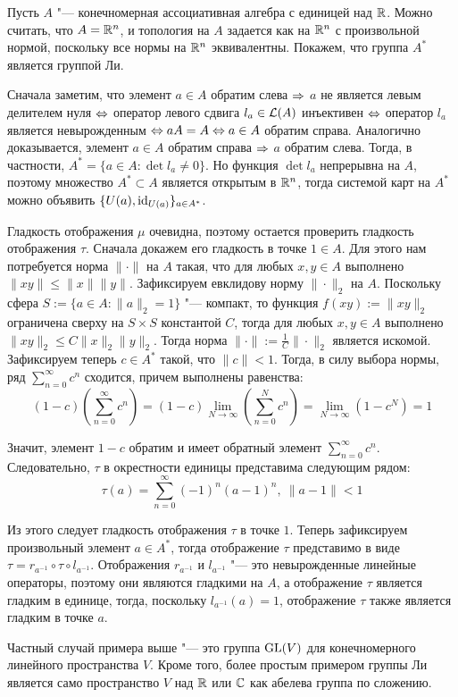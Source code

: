 \begin{example}
	Пусть $A$ "--- конечномерная ассоциативная алгебра с единицей над $\mathbb{R}$. Можно считать, что $A = \mathbb{R}^n$, и топология на $A$ задается как на $\mathbb{R}^n$ с произвольной нормой, поскольку все нормы на $\mathbb{R}^n$ эквивалентны. Покажем, что группа $A^*$ является группой Ли. 
	
	Сначала заметим, что элемент $a \in A$ обратим слева $\Rightarrow$ $a$ не является левым делителем нуля $\Leftrightarrow$ оператор левого сдвига $l_a \in \mathcal L(A)$ инъективен $\Leftrightarrow$ оператор $l_a$ является невырожденным $\lra aA = A \hm\lra a \in A$ обратим справа. Аналогично доказывается, элемент $a \in A$ обратим справа $\Rightarrow$ $a$ обратим слева. Тогда, в частности, $A^* = \{a \in A: \det{l_a} \ne 0\}$. Но  функция $\det{l_a}$ непрерывна на $A$, поэтому множество $A^* \subset A$ является открытым в $\mathbb{R}^n$, тогда системой карт на $A^*$ можно объявить $\{U(a), \mathrm{id}_{U(a)}\}_{a \in A^*}$.
	
	Гладкость отображения $\mu$ очевидна, поэтому остается проверить гладкость отображения $\tau$. Сначала докажем его гладкость в точке $1 \in A$. Для этого нам потребуется норма $\| \cdot \|$ на $A$ такая, что для любых $x, y \in A$ выполнено $\|xy\| \le \|x\| \|y\|$. Зафиксируем евклидову норму $\| \cdot \|_2$ на $A$. Поскольку сфера $S := \{a \in A: \|a\|_2 = 1\}$ "--- компакт, то функция $f(xy) := \|xy\|_2$ ограничена сверху на $S \times S$ константой $C$, тогда для любых $x, y \in A$ выполнено $\|xy\|_2 \le C\|x\|_2\|y\|_2$. Тогда норма $\|\cdot\| := \frac{1}{C}\|\cdot\|_2$ является искомой. Зафиксируем теперь $c \in A^*$ такой, что $\|c\| < 1$. Тогда, в силу выбора нормы, ряд $\sum_{n=0}^\infty c^n$ сходится, причем выполнены равенства:
	\[(1-c)\left(\sum_{n=0}^\infty c^n\right) = (1-c)\lim_{N \to \infty}\left(\sum_{n=0}^Nc^n\right) = \lim_{N \to \infty}\left(1 - c^N\right) = 1\]
	
	Значит, элемент $1 - c$ обратим и имеет обратный элемент $\sum_{n=0}^\infty c^n$. Следовательно, $\tau$ в окрестности единицы представима следующим рядом:
	\[\tau(a) = \sum_{n=0}^\infty (-1)^n(a - 1)^n,~\|a - 1\| < 1\]
	
	Из этого следует гладкость отображения $\tau$ в точке $1$. Теперь зафиксируем произвольный элемент $a \in A^*$, тогда отображение $\tau$ представимо в виде $\tau = r_{a^{-1}} \circ \tau \circ l_{a^{-1}}$. Отображения $r_{a^{-1}}$ и $l_{a^{-1}}$ "--- это невырожденные линейные операторы, поэтому они являются гладкими на $A$, а отображение $\tau$ является гладким в единице, тогда, поскольку $l_{a^{-1}}(a) = 1$, отображение $\tau$ также является гладким в точке $a$.
\end{example}

\begin{note}
	Частный случай примера выше "--- это группа $\operatorname{GL}(V)$ для конечномерного линейного пространства $V$. Кроме того, более простым примером группы Ли является само пространство $V$ над $\mathbb{R}$ или $\mathbb{C}$ как абелева группа по сложению.
\end{note}